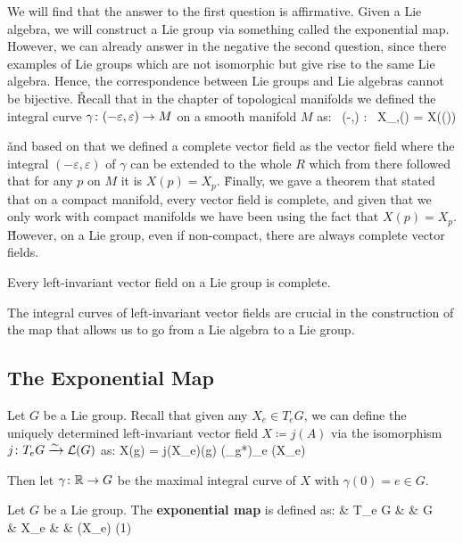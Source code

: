 We will find that the answer to the first question is affirmative. Given a Lie algebra, we will construct a Lie group
via something called the exponential map. However, we can already answer in the negative the second question, since
there examples of Lie groups which are not isomorphic but give rise to the same Lie algebra. Hence, the
correspondence between Lie groups and Lie algebras cannot be bijective. \v

Recall that in the chapter of topological manifolds we defined the integral curve $\gamma\colon(-\varepsilon, \varepsilon)
\to M$ on a smooth manifold $M$ as:
\bse
\forall \, \lambda \in (-\varepsilon,\varepsilon) : \ X_{\gamma,\gamma (\lambda)} = X(\gamma(\lambda))
\ese

\v

and based on that we defined a complete vector field as the vector field where the integral $(-\varepsilon,
\varepsilon)$ of $\gamma$ can be extended to the whole $R$ which from there followed that for any $p$ on $M$ it is $X
(p) = X_p$. \v

Finally, we gave a theorem that stated that on a compact manifold, every vector field is complete, and given that we
only work with compact manifolds we have been using the fact that $X(p) = X_p$. \v

However, on a Lie group, even if non-compact, there are always complete vector fields.

\bt[]
Every left-invariant vector field on a Lie group is complete.
\et

The integral curves of left-invariant vector fields are crucial in the construction of the map that allows us to go
from a Lie algebra to a Lie group.

\subsection{The Exponential Map}

Let $G$ be a Lie group. Recall that given any $X_e\in T_e G$, we can define the uniquely determined left-invariant
vector field $X \coloneqq j(A)$ via the isomorphism $j\colon T_e G \xrightarrow{\sim}\mathcal{L}(G)$ as:
\bse
X(g) = j(X_e)(g) \coloneqq (\ell_{g*})_e (X_e)
\ese

Then let $\gamma \colon \mathbb{R} \to G$ be the maximal integral curve of $X$ with $\gamma(0) = e\in G$.

Let $G$ be a Lie group. The \textbf{exponential map} is defined as:
\exp \cl & T_e G & \to & G\\ & X_e & \mapsto & \exp(X_e) \coloneqq \gamma(1)
\ei
\ed

